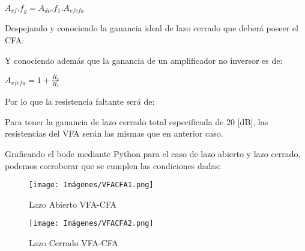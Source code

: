     \begin{center}
        $A_{vf}.f_g = A_{do}.f_1.A_{vfcfa}$
    \end{center}

    Despejando y conociendo la ganancia ideal de lazo cerrado que deberá poseer el CFA:

    \begin{center}
    \end{center}

    Y conociendo además que la ganancia de un amplificador no inversor es de:

    \begin{center}
        $A_{vfcfa} = 1 + \frac{R_2}{R_1}$
    \end{center}

    Por lo que la resistencia faltante será de:

    \begin{center}
    \end{center}

    Para tener la ganancia de lazo cerrado total especificada de 20 [dB], las resistencias del VFA serán las mismas que en anterior caso.

    Graficando el bode mediante Python para el caso de lazo abierto y lazo cerrado, podemos corroborar que se cumplen las condiciones dadas:

    \begin{figure}[h]
        \centering
        \texttt{[image: Imágenes/VFACFA1.png]}
        \caption{Lazo Abierto VFA-CFA}
    \end{figure}
    
    \begin{figure}[h]
        \centering
        \texttt{[image: Imágenes/VFACFA2.png]}
        \caption{Lazo Cerrado VFA-CFA}
    \end{figure}

    \newpage
